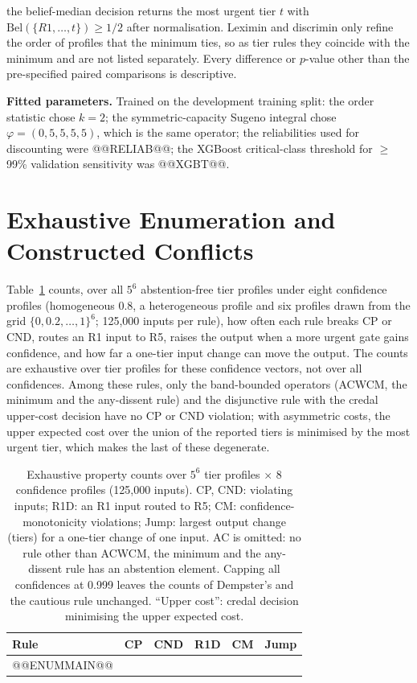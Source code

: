 \documentclass[11pt,a4paper]{article}%
\begin{document}
the belief-median decision returns the most urgent tier $t$ with $\mathrm{Bel}(\{R1,\ldots,t\})\ge1/2$ after normalisation. Leximin and discrimin \cite{dubois1996refinements} only refine the order of profiles that the minimum ties, so as tier rules they coincide with the minimum and are not listed separately. Every difference or $p$-value other than the pre-specified paired comparisons is descriptive.

\textbf{Fitted parameters.} Trained on the development training split: the order statistic chose $k=2$; the symmetric-capacity Sugeno integral chose $\varphi=(0,5,5,5,5)$, which is the same operator; the reliabilities used for discounting were @@RELIAB@@; the XGBoost critical-class threshold for $\ge$99\% validation sensitivity was @@XGBT@@.

\section{Exhaustive Enumeration and Constructed Conflicts}\label{sup:enum}

Table~\ref{tab:enum} counts, over all $5^6$ abstention-free tier profiles under eight confidence profiles (homogeneous 0.8, a heterogeneous profile and six profiles drawn from the grid $\{0,0.2,\ldots,1\}^6$; 125{,}000 inputs per rule), how often each rule breaks CP or CND, routes an R1 input to R5, raises the output when a more urgent gate gains confidence, and how far a one-tier input change can move the output. The counts are exhaustive over tier profiles for these confidence vectors, not over all confidences. Among these rules, only the band-bounded operators (ACWCM, the minimum and the any-dissent rule) and the disjunctive rule with the credal upper-cost decision have no CP or CND violation; with asymmetric costs, the upper expected cost over the union of the reported tiers is minimised by the most urgent tier, which makes the last of these degenerate.

\begin{table}[htbp]
\caption{Exhaustive property counts over $5^6$ tier profiles $\times$ 8 confidence profiles (125{,}000 inputs). CP, CND: violating inputs; R1D: an R1 input routed to R5; CM: confidence-monotonicity violations; Jump: largest output change (tiers) for a one-tier change of one input. AC is omitted: no rule other than ACWCM, the minimum and the any-dissent rule has an abstention element. Capping all confidences at 0.999 leaves the counts of Dempster's and the cautious rule unchanged. ``Upper cost'': credal decision minimising the upper expected cost.}\label{tab:enum}
\small
\begin{tabular}{@{}lrrrrr@{}}
\toprule
Rule & CP & CND & R1D & CM & Jump \\
\midrule
@@ENUMMAIN@@
\bottomrule
\end{tabular}
\end{table}
\end{document}
